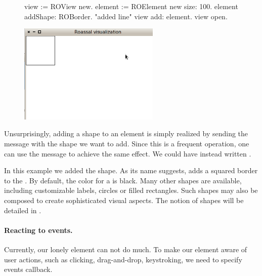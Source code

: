\documentclass[a4paper,10pt,twoside]{book}
\begin{document}
\begin{figure}[H]
      \begin{minipage}[t]{0.5\textwidth}
      \vspace{0pt}
\begin{code}{}
view := ROView new.
element := ROElement new size: 100.
element addShape: ROBorder. "added line"
view add: element.
view open.
\end{code}
   \end{minipage}
   \hfill
   \begin{minipage}[t]{0.6\textwidth}
      \vspace{0pt} \raggedright
       \centering
		\includegraphics[width=0.6\textwidth]{ex2}
   \end{minipage}
\label{fig:ex2}
\end{figure}

Unsurprisingly, adding a shape to an element is simply realized by sending the  message with the shape we want to add. Since this is a frequent operation, one can use the \ct{+} message to achieve the same effect. We could have instead written . 

In this example we added the  shape. As its name suggests,  adds a squared border to the . By default, the color for a  is black. Many other shapes are available, including customizable labels, circles or filled rectangles. Such shapes may also be composed to create sophisticated visual aspects. The notion of shapes will be detailed in .

\paragraph{Reacting to events.}
Currently, our lonely element can not do much. To make our element aware of user actions, such as clicking, drag-and-drop, keystroking, we need to specify events callback. 
\end{document}

